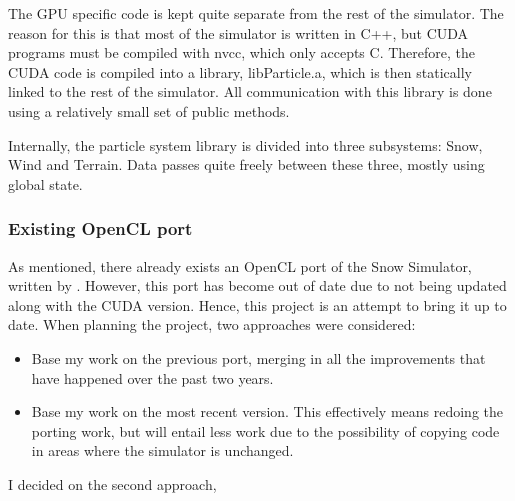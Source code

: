 The GPU specific code is kept quite separate from the rest of the simulator. The reason for this is that most of the simulator is written in C++, but CUDA programs must be compiled with nvcc, which only accepts C. Therefore, the CUDA code is compiled into a library, libParticle.a, which is then statically linked to the rest of the simulator. All communication with this library is done using a relatively small set of public methods.

Internally, the particle system library is divided into three subsystems: Snow, Wind and Terrain. Data passes quite freely between these three, mostly using global state. 

\subsubsection*{Existing OpenCL port}
As mentioned, there already exists an OpenCL port of the Snow Simulator, written by \citet{vestre2012enhancing}. However, this port has become out of date due to not being updated along with the CUDA version. Hence, this project is an attempt to bring it up to date. When planning the project, two approaches were considered: 
\begin{itemize}
\item Base my work on the previous port, merging in all the improvements that have happened over the past two years.
\item Base my work on the most recent version. This effectively means redoing the porting work, but will entail less work due to the possibility of copying code in areas where the simulator is unchanged.
\end{itemize}
I decided on the second approach,